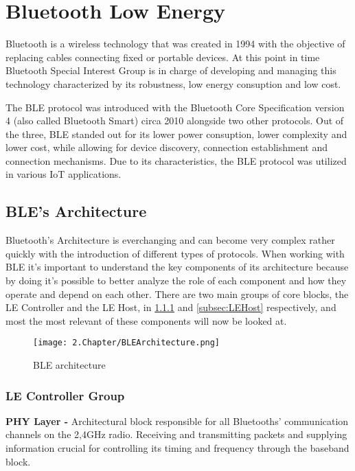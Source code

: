 \section{Bluetooth Low Energy}
\label{sec:BLE}

Bluetooth is a wireless technology that was created in 1994 with the objective of replacing cables connecting fixed or portable devices. At this point in time Bluetooth Special Interest Group is in charge of developing and managing this technology characterized by its robustness, low energy consuption and low cost. 

The \ac{BLE} protocol was introduced with the Bluetooth Core Specification version 4 (also called Bluetooth Smart) circa 2010 alongside two other protocols.  Out of the three, \ac{BLE} standed out for its lower power consuption, lower complexity and lower cost, while allowing for  device discovery, connection establishment and connection mechanisms. Due to its characteristics, the \ac{BLE} protocol was utilized in various \ac{IoT} applications.  

\subsection{\ac{BLE}'s Architecture}
\label{subsec:BLEArchitecture}

Bluetooth's Architecture is everchanging and can become very complex rather quickly with the introduction of different types of protocols.
 When working with \ac{BLE} it's important to understand the key components of its architecture  because by doing it's possible to better analyze the role of each component and how they operate and depend on each other. There are two main groups of core blocks, the \ac{LE} Controller and the \ac{LE} Host, in \ref{subsec:LEController} and \ref{subsec:LEHost} respectively, and most the most relevant of these components will now be looked at.
 
 \begin{figure}[H]
	\centering
		\texttt{[image: 2.Chapter/BLEArchitecture.png]}
	\caption[\ac{BLE} Architecture]{\ac{BLE} architecture}
	\label{fig:BLEarchitecture}
\end{figure}

\subsubsection{ \ac{LE} Controller Group}
\label{subsec:LEController}

\textbf{\ac{PHY} Layer -} Architectural block responsible for all Bluetooths' communication channels on the 2,4GHz radio. Receiving and transmitting packets and supplying information crucial for controlling its timing and frequency through the baseband block.


